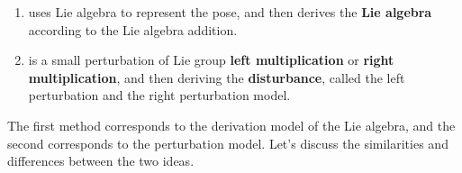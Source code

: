 \begin{enumerate}
	\item uses Lie algebra to represent the pose, and then derives the \textbf{Lie algebra} according to the Lie algebra addition.
	\item is a small perturbation of Lie group \textbf{left multiplication} or \textbf{right multiplication}, and then deriving the \textbf{disturbance}, called the left perturbation and the right perturbation model.
\end{enumerate}

The first method corresponds to the derivation model of the Lie algebra, and the second corresponds to the perturbation model. Let's discuss the similarities and differences between the two ideas.